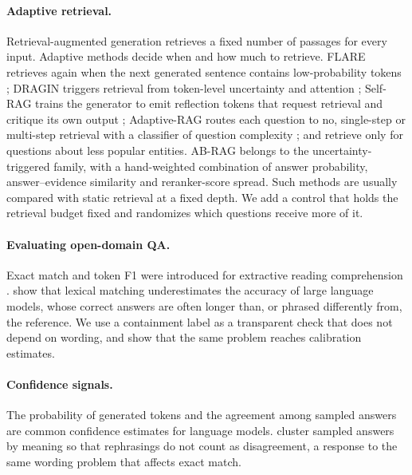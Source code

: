 \documentclass[11pt]{article}
\begin{document}
\paragraph{Adaptive retrieval.} Retrieval-augmented generation \citep{lewis2020rag} retrieves a fixed number of passages for every input. Adaptive methods decide when and how much to retrieve. FLARE retrieves again when the next generated sentence contains low-probability tokens \citep{jiang2023flare}; DRAGIN triggers retrieval from token-level uncertainty and attention \citep{su2024dragin}; Self-RAG trains the generator to emit reflection tokens that request retrieval and critique its own output \citep{asai2024selfrag}; Adaptive-RAG routes each question to no, single-step or multi-step retrieval with a classifier of question complexity \citep{jeong2024adaptiverag}; and \citet{mallen2023when} retrieve only for questions about less popular entities. AB-RAG \citep{kamthan2026abrag} belongs to the uncertainty-triggered family, with a hand-weighted combination of answer probability, answer--evidence similarity and reranker-score spread. Such methods are usually compared with static retrieval at a fixed depth. We add a control that holds the retrieval budget fixed and randomizes which questions receive more of it.

\paragraph{Evaluating open-domain QA.} Exact match and token F1 were introduced for extractive reading comprehension \citep{rajpurkar2016squad}. \citet{kamalloo2023evaluating} show that lexical matching underestimates the accuracy of large language models, whose correct answers are often longer than, or phrased differently from, the reference. We use a containment label as a transparent check that does not depend on wording, and show that the same problem reaches calibration estimates.

\paragraph{Confidence signals.} The probability of generated tokens \citep{kadavath2022language} and the agreement among sampled answers \citep{kuhn2023semantic} are common confidence estimates for language models. \citet{kuhn2023semantic} cluster sampled answers by meaning so that rephrasings do not count as disagreement, a response to the same wording problem that affects exact match.
\end{document}
